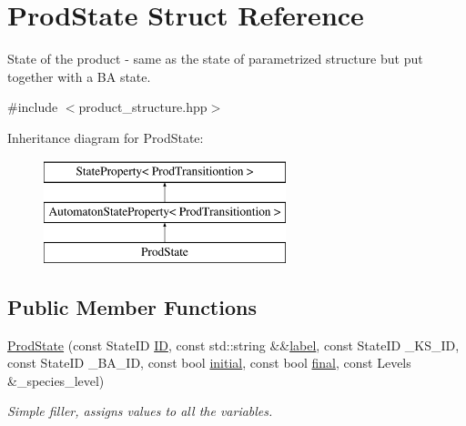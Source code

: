 \hypertarget{structProdState}{\section{\-Prod\-State \-Struct \-Reference}
\label{structProdState}
}


\-State of the product -\/ same as the state of parametrized structure but put together with a \-B\-A state.  




{\ttfamily \#include $<$product\-\_\-structure.\-hpp$>$}

\-Inheritance diagram for \-Prod\-State\-:\begin{figure}[H]
\begin{center}
\leavevmode
\includegraphics[height=3.000000cm]{structProdState}
\end{center}
\end{figure}
\subsection*{\-Public \-Member \-Functions}
\begin{DoxyCompactItemize}
\item 
\hypertarget{structProdState_a4a3330daa5026f94e302e61f58e41521}{\hyperlink{structProdState_a4a3330daa5026f94e302e61f58e41521}{\-Prod\-State} (const \-State\-I\-D \hyperlink{structStateProperty_af33be20c9033f9b6524c0447e7ac647e}{\-I\-D}, const std\-::string \&\&\hyperlink{structStateProperty_a7cfb634f80b68196eefa54e8ee98a5fe}{label}, const \-State\-I\-D \-\_\-\-K\-S\-\_\-\-I\-D, const \-State\-I\-D \-\_\-\-B\-A\-\_\-\-I\-D, const bool \hyperlink{structAutomatonStateProperty_a01c05b93d68d3f72b76ab9835abc5476}{initial}, const bool \hyperlink{structAutomatonStateProperty_aa95898834a149d202575a6f655a5e5e2}{final}, const \-Levels \&\-\_\-species\-\_\-level)}\label{structProdState_a4a3330daa5026f94e302e61f58e41521}

\begin{DoxyCompactList}\small\item\em \-Simple filler, assigns values to all the variables. \end{DoxyCompactList}\end{DoxyCompactItemize}
